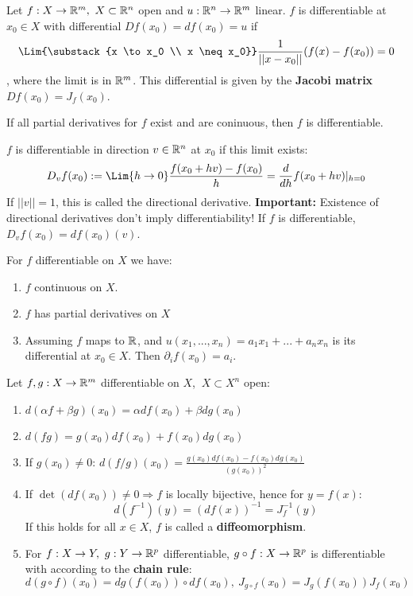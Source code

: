 \begin{definition}[Differential]
	Let $f: X \to \mathbb{R}^m, \  X \subset \mathbb{R}^n $ open and $u: \mathbb{R}^n \to \mathbb{R}^m$ linear.
	$f$ is differentiable at $x_0 \in X$ with differential $Df(x_0) = df(x_0) = u$ if
	$$\Lim{\substack{x \to x_0 \\ x \neq x_0}} \frac{1}{||x-x_0||}(f(x) - f(x_0)) = 0$$
	, where the limit is in $\mathbb{R}^m$.
	This differential is given by the \textbf{Jacobi matrix} $Df(x_0) = J_f(x_0)$.
\end{definition}

\begin{theorem}[]
	If all partial derivatives for $f$ exist and are coninuous, then $f$ is differentiable.
\end{theorem}

\begin{definition}
	$f$ is differentiable in direction $v\in \mathbb{R}^n$ at $x_0$ if this limit exists:
	$$D_vf(x_0) := \Lim{h\to 0} \frac{f(x_0 + hv) - f(x_0)}{h} = \frac{d}{dh}f(x_0 + hv)|_{h=0}$$
	If $||v|| = 1$, this is called the directional derivative.
	\textbf{Important:} Existence of directional derivatives don't imply differentiability!
	If $f$ is differentiable, $D_vf(x_0) = df(x_0)(v)$.
\end{definition}

\begin{proposition}[]
	For $f$ differentiable on $X$ we have:
	\begin{enumerate}
		\item $f$ continuous on $X$.
		\item $f$ has partial derivatives on $X$
		\item Assuming $f$ maps to $\mathbb{R}$, and $u(x_1,...,x_n) = a_1x_1 + ... + a_nx_n$ is its differential at $x_0 \in X$.
			Then $\partial_if(x_0) = a_i$.
	\end{enumerate}
\end{proposition}

\begin{proposition}[]
	Let $f, g: X \to \mathbb{R}^m$ differentiable on $X$, $\ X \subset X^n$ open:
	\begin{enumerate}
		\item $d(\alpha f + \beta g)(x_0) = \alpha df(x_0) + \beta dg(x_0)$
		\item $d(fg) = g(x_0)df(x_0) + f(x_0)dg(x_0)$
		\item If $g(x_0) \neq 0$: $d(f/g)(x_0) =  \frac{g(x_0)df(x_0) - f(x_0)dg(x_0)}{(g(x_0))^2}$
		\item If $\det(df(x_0)) \neq 0 \Rightarrow f$ is locally bijective, hence for $y = f(x)$:
			$$d(f^{-1})(y) = (df(x))^{-1} = J^{-1}_f(y)$$
			If this holds for all $x \in X$, $f$ is called a \textbf{diffeomorphism}. 
		\item For $f: X \to Y, \ g: Y \to \mathbb{R}^p$ differentiable, $g\circ f: X \to \mathbb{R}^p$ is differentiable with according to the \textbf{chain rule}:
			$$d(g\circ f)(x_0) = dg(f(x_0))\circ df(x_0), \ J_{g\circ f}(x_0) = J_g(f(x_0))J_f(x_0)$$
	\end{enumerate}
\end{proposition}

